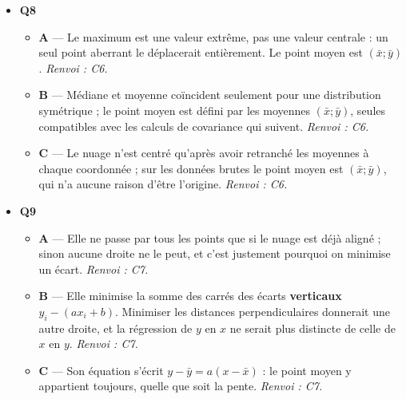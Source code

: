\begin{itemize}
\begin{itemize}
    \item \textbf{B} — C'est le résultat de \textbf{deux} étapes, pas d'une seule : la dichotomie remplace une borne par le milieu, ici $[0{,}5;1]$. La coupe suivante donnera $[0{,}5;0{,}75]$. \emph{Renvoi : C3.}
    \item \textbf{D} — Cet intervalle n'est pas une moitié de $[0;1]$ : la dichotomie ne recentre pas l'intervalle autour du milieu, elle en supprime une moitié. \emph{Renvoi : C3.}
  \end{itemize}
  \item \textbf{Q8}
  \begin{itemize}
    \item \textbf{A} — Le maximum est une valeur extrême, pas une valeur centrale : un seul point aberrant le déplacerait entièrement. Le point moyen est $(\bar x;\bar y)$. \emph{Renvoi : C6.}
    \item \textbf{B} — Médiane et moyenne coïncident seulement pour une distribution symétrique ; le point moyen est défini par les moyennes $(\bar x;\bar y)$, seules compatibles avec les calculs de covariance qui suivent. \emph{Renvoi : C6.}
    \item \textbf{C} — Le nuage n'est centré qu'après avoir retranché les moyennes à chaque coordonnée ; sur les données brutes le point moyen est $(\bar x;\bar y)$, qui n'a aucune raison d'être l'origine. \emph{Renvoi : C6.}
  \end{itemize}
  \item \textbf{Q9}
  \begin{itemize}
    \item \textbf{A} — Elle ne passe par tous les points que si le nuage est déjà aligné ; sinon aucune droite ne le peut, et c'est justement pourquoi on minimise un écart. \emph{Renvoi : C7.}
    \item \textbf{B} — Elle minimise la somme des carrés des écarts \textbf{verticaux} $y_i-(ax_i+b)$. Minimiser les distances perpendiculaires donnerait une autre droite, et la régression de $y$ en $x$ ne serait plus distincte de celle de $x$ en $y$. \emph{Renvoi : C7.}
    \item \textbf{C} — Son équation s'écrit $y-\bar y=a(x-\bar x)$ : le point moyen y appartient toujours, quelle que soit la pente. \emph{Renvoi : C7.}
  \end{itemize}
\end{itemize}
\fi
